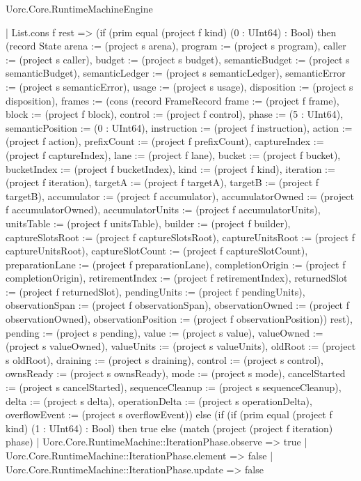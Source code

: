 \begin{lexlean}{Uorc.Core.RuntimeMachineEngine}
\begin{semanticmodule}
{    | List.cons f rest => (if (prim equal (project f kind) (0 : UInt64) : Bool) then (record State {arena := (project s arena), program := (project s program), caller := (project s caller), budget := (project s budget), semanticBudget := (project s semanticBudget), semanticLedger := (project s semanticLedger), semanticError := (project s semanticError), usage := (project s usage), disposition := (project s disposition), frames := (cons (record FrameRecord {frame := (project f frame), block := (project f block), control := (project f control), phase := (5 : UInt64), semanticPosition := (0 : UInt64), instruction := (project f instruction), action := (project f action), prefixCount := (project f prefixCount), captureIndex := (project f captureIndex), lane := (project f lane), bucket := (project f bucket), bucketIndex := (project f bucketIndex), kind := (project f kind), iteration := (project f iteration), targetA := (project f targetA), targetB := (project f targetB), accumulator := (project f accumulator), accumulatorOwned := (project f accumulatorOwned), accumulatorUnits := (project f accumulatorUnits), unitsTable := (project f unitsTable), builder := (project f builder), captureSlotsRoot := (project f captureSlotsRoot), captureUnitsRoot := (project f captureUnitsRoot), captureSlotCount := (project f captureSlotCount), preparationLane := (project f preparationLane), completionOrigin := (project f completionOrigin), retirementIndex := (project f retirementIndex), returnedSlot := (project f returnedSlot), pendingUnits := (project f pendingUnits), observationSpan := (project f observationSpan), observationOwned := (project f observationOwned), observationPosition := (project f observationPosition)}) rest), pending := (project s pending), value := (project s value), valueOwned := (project s valueOwned), valueUnits := (project s valueUnits), oldRoot := (project s oldRoot), draining := (project s draining), control := (project s control), ownsReady := (project s ownsReady), mode := (project s mode), cancelStarted := (project s cancelStarted), sequenceCleanup := (project s sequenceCleanup), delta := (project s delta), operationDelta := (project s operationDelta), overflowEvent := (project s overflowEvent)}) else (if (if (prim equal (project f kind) (1 : UInt64) : Bool) then true else (match (project (project f iteration) phase)
      | Uorc.Core.RuntimeMachine::IterationPhase.observe => true
      | Uorc.Core.RuntimeMachine::IterationPhase.element => false
      | Uorc.Core.RuntimeMachine::IterationPhase.update => false
}
\end{semanticmodule}
\end{lexlean}
